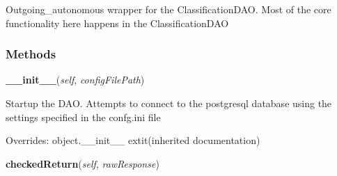 Outgoing\_autonomous wrapper for the ClassificationDAO. Most of the core 
functionality here happens in the ClassificationDAO



  \subsubsection{Methods}

    \vspace{0.5ex}

\hspace{.8\funcindent}\begin{boxedminipage}{\funcwidth}

    \raggedright \textbf{\_\_init\_\_}(\textit{self}, \textit{configFilePath})

\setlength{\parskip}{2ex}
    Startup the DAO. Attempts to connect to the postgresql database using 
    the settings specified in the confg.ini file

\setlength{\parskip}{1ex}
      Overrides: object.\_\_init\_\_ 	extit{(inherited documentation)}

    \end{boxedminipage}

    \label{src:dao:outgoing_autonomous_dao:OutgoingAutonomousDAO:checkedReturn}

    \vspace{0.5ex}

\hspace{.8\funcindent}\begin{boxedminipage}{\funcwidth}

    \raggedright \textbf{checkedReturn}(\textit{self}, \textit{rawResponse})

\setlength{\parskip}{2ex}
\setlength{\parskip}{1ex}
    \end{boxedminipage}

    \vspace{0.5ex}

